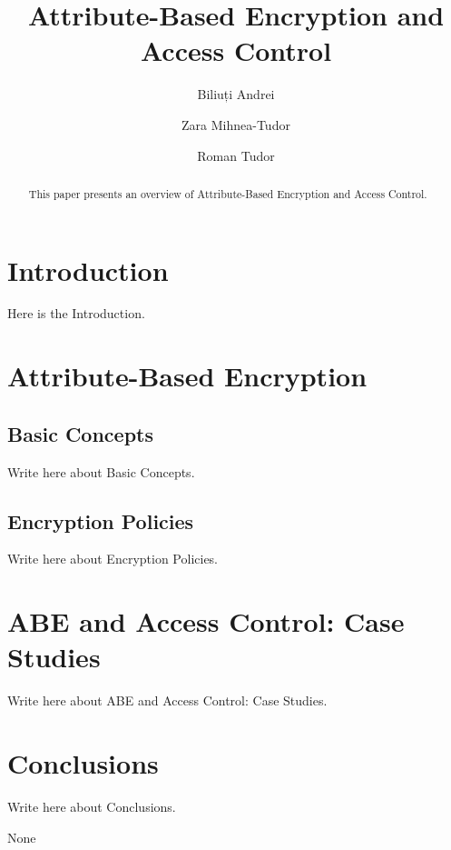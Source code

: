 \documentclass[runningheads]{llncs}
\begin{document}
\title{Attribute-Based Encryption and Access Control}

\author{Biliuți Andrei \and Zara Mihnea-Tudor \and Roman Tudor}


\maketitle

\begin{abstract}
This paper presents an overview of Attribute-Based Encryption and Access Control.

\end{abstract}




\section{Introduction}
Here is the Introduction.




\section{Attribute-Based Encryption}


\subsection{Basic Concepts}
Write here about Basic Concepts.



\subsection{Encryption Policies}
Write here about Encryption Policies.




\section{ABE and Access Control: Case Studies}
Write here about ABE and Access Control: Case Studies.


\section{Conclusions}
Write here about Conclusions.




\begin{thebibliography}{8}

None

\end{thebibliography}
\end{document}
